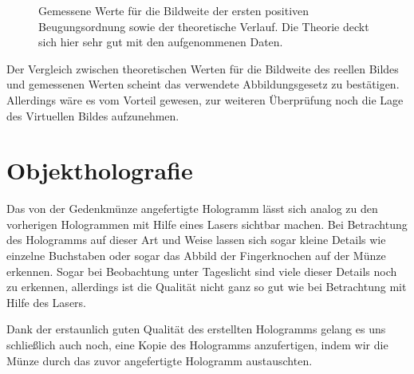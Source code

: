 \documentclass[bigchapter,colorback,accentcolor=tud4b,linedtoc,11pt]{tudreport}
\begin{document}
\begin{figure}[H]
    \caption{Gemessene Werte für die Bildweite der ersten
        positiven Beugungsordnung sowie der theoretische
      Verlauf. Die Theorie deckt sich hier sehr gut mit den
      aufgenommenen Daten.}
\end{figure}

Der Vergleich zwischen theoretischen Werten für die Bildweite des reellen Bildes
und gemessenen Werten scheint das verwendete Abbildungsgesetz zu
bestätigen. Allerdings wäre es vom Vorteil gewesen, zur weiteren Überprüfung
noch die Lage des Virtuellen Bildes aufzunehmen.

\section{Objektholografie}

Das von der Gedenkmünze angefertigte Hologramm lässt sich analog zu den
vorherigen Hologrammen mit Hilfe eines Lasers sichtbar machen. Bei Betrachtung
des Hologramms auf dieser Art und Weise lassen sich sogar kleine Details wie
einzelne Buchstaben oder sogar das Abbild der Fingerknochen auf der Münze
erkennen. Sogar bei Beobachtung unter Tageslicht sind viele dieser Details noch
zu erkennen, allerdings ist die Qualität nicht ganz so gut wie bei Betrachtung
mit Hilfe des Lasers.

Dank der erstaunlich guten Qualität des erstellten Hologramms gelang es uns
schließlich auch noch, eine Kopie des Hologramms anzufertigen, indem wir die
Münze durch das zuvor angefertigte Hologramm austauschten.
\end{document}
